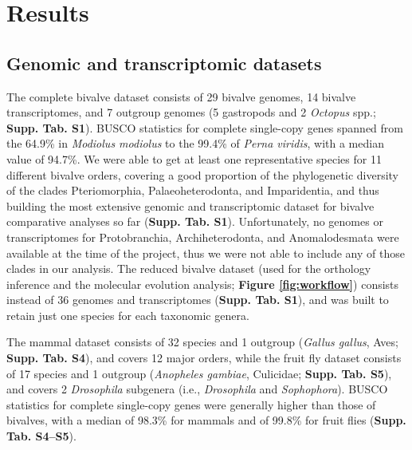 \documentclass[../main.tex]{subfiles}
\begin{document}
\section{Results} \label{chapter3_results}
\subsection{Genomic and transcriptomic datasets}
The complete bivalve dataset consists of 29 bivalve genomes, 14 bivalve transcriptomes, and 7 outgroup genomes (5 gastropods and 2 \textit{Octopus} spp.; \textbf{Supp. Tab. S1}). BUSCO statistics for complete single-copy genes spanned from the 64.9\% in \textit{Modiolus modiolus} to the 99.4\% of \textit{Perna viridis}, with a median value of 94.7\%. We were able to get at least one representative species for 11 different bivalve orders, covering a good proportion of the phylogenetic diversity of the clades Pteriomorphia, Palaeoheterodonta, and Imparidentia, and thus building the most extensive genomic and transcriptomic dataset for bivalve comparative analyses so far (\textbf{Supp. Tab. S1}). Unfortunately, no genomes or transcriptomes for Protobranchia, Archiheterodonta, and Anomalodesmata were available at the time of the project, thus we were not able to include any of those clades in our analysis. The reduced bivalve dataset (used for the orthology inference and the molecular evolution analysis; \textbf{Figure \ref{fig:workflow}}) consists instead of 36 genomes and transcriptomes (\textbf{Supp. Tab. S1}), and was built to retain just one species for each taxonomic genera.

The mammal dataset consists of 32 species and 1 outgroup (\textit{Gallus gallus}, Aves; \textbf{Supp. Tab. S4}), and covers 12 major orders, while the fruit fly dataset consists of 17 species and 1 outgroup (\textit{Anopheles gambiae}, Culicidae; \textbf{Supp. Tab. S5}), and covers 2 \textit{Drosophila} subgenera (i.e., \textit{Drosophila} and \textit{Sophophora}). BUSCO statistics for complete single-copy genes were generally higher than those of bivalves, with a median of 98.3\% for mammals and of 99.8\% for fruit flies (\textbf{Supp. Tab. S4--S5}).
\end{document}
